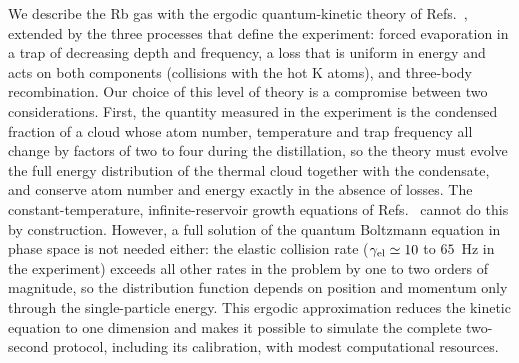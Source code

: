 We describe the Rb gas with the ergodic quantum-kinetic theory of
Refs.~\cite{Zaremba1999,Bijlsma2000}, extended by the three processes that
define the experiment: forced evaporation in a trap of decreasing depth and
frequency, a loss that is uniform in energy and acts on both components
(collisions with the hot K atoms), and three-body recombination. Our choice of
this level of theory is a compromise between two considerations. First, the
quantity measured in the experiment is the condensed fraction of a cloud whose
atom number, temperature and trap frequency all change by factors of two to
four during the distillation, so the theory must evolve the full energy
distribution of the thermal cloud together with the condensate, and conserve
atom number and energy exactly in the absence of losses. The constant-temperature,
infinite-reservoir growth equations of Refs.~\cite{Gardiner1997,Gardiner1998}
cannot do this by construction. However, a full solution of the quantum
Boltzmann equation in phase space is not needed either: the elastic collision
rate ($\gamma_{\rm el}\simeq 10$ to $65$~Hz in the experiment) exceeds all other
rates in the problem by one to two orders of magnitude, so the distribution
function depends on position and momentum only through the single-particle
energy. This ergodic approximation reduces the kinetic equation to one
dimension and makes it possible to simulate the complete two-second protocol,
including its calibration, with modest computational resources.

